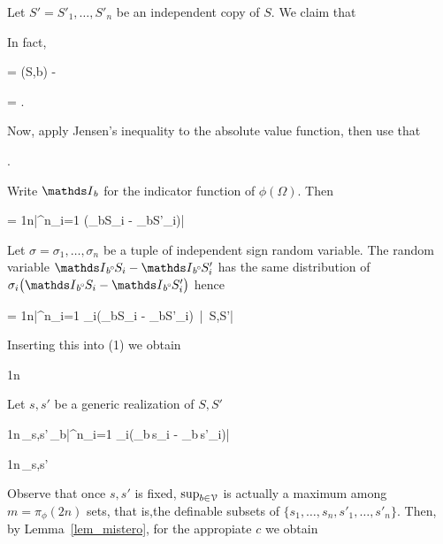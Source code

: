 \documentclass[scombinatorics.tex]{subfiles}
\begin{document}
Let $S'=S'_1,\dots,S'_n$ be an independent copy of $S$.
We claim that

{\le}
{\Ex{}}

In fact,

{=}
{\Fr(S,b) - \Ex\big[\Fr(S',b)\big]}

\ceq{}
{=}
{\Ex{}.}

Now, apply Jensen's inequality to the absolute value function, then use that 

{\le}
{\Ex{}.}

Write $\Indicator_b$ for the indicator function of $\phi(\Omega)$.
Then

{=}
{\frac1n\bigg|\sum^n_{i=1} \Big(\Indicator_b\smallcirc S_i -  \Indicator_b\smallcirc S'_i\Big)\bigg|}

Let $\sigma=\sigma_1,\dots,\sigma_n$ be a tuple of independent sign random variable.
The random variable $\Indicator_b\smallcirc S_i -  \Indicator_b\smallcirc S'_i$ has the same distribution of $\sigma_i\big(\Indicator_b\smallcirc S_i -  \Indicator_b\smallcirc S'_i\big)$ hence

\ceq{}
{=}
{\frac1n\Ex\bigg|\sum^n_{i=1} \sigma_i\Big(\Indicator_b\smallcirc S_i -  \Indicator_b\smallcirc S'_i\Big)\ \Big|\ S,S'\bigg|}

Inserting this into (1) we obtain


{\le}
{\frac1n\,\Ex\bigg[\sup_{b\in\V}\Ex\bigg|\sum^n_{i=1} \sigma_i\Big(\Indicator_b\smallcirc S_i -  \Indicator_b\smallcirc S'_i\Big)\ \Big|\ S,S'\bigg|\bigg]}

Let $s,s'$ be a generic realization of $S,S'$


\ceq{}
{\le}
{\frac1n\,\sup_{s,s'}\,\sup_{b\in\V}\Ex\bigg|\sum^n_{i=1} \sigma_i\big(\Indicator_b\,s_i -  \Indicator_b\,s'_i\big)\bigg|}

\ceq{}
{\le}
{\frac1n\,\sup_{s,s'}\Ex\bigg[\sup_{b\in\V}\bigg|\sum^n_{i=1} \sigma_i\big(\Indicator_b\,s_i -  \Indicator_b\,s'_i\big)\bigg|\bigg]}

Observe that once $s,s'$ is fixed, $\sup_{b\in\EuScript V}$ is actually a maximum among $m=\pi_\phi(2n)$ sets, that is,the definable subsets of $\{s_1,\dots,s_n,s'_1,\dots,s'_n\}$.
Then, by Lemma~\ref{lem_mistero}, for the appropiate $c$ we obtain
\end{document}
